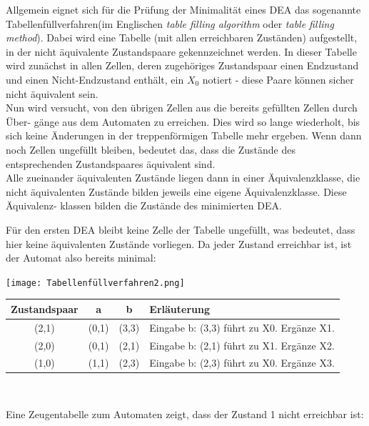 \begin{teile}
	
	\item
		Allgemein eignet sich für die Prüfung der Minimalität eines DEA das sogenannte \glqq Tabellenfüllverfahren\grqq (im Englischen \textit{table filling algorithm} oder \textit{table filling method}). Dabei wird eine Tabelle (mit allen erreichbaren Zuständen) aufgestellt, in der nicht äquivalente Zustandspaare gekennzeichnet werden. In dieser Tabelle wird zunächst in allen Zellen, deren zugehöriges Zustandspaar einen Endzustand und einen Nicht-Endzustand enthält, ein $X_0$ notiert - diese Paare können sicher nicht äquivalent sein.\\		
		Nun wird versucht, von den übrigen Zellen aus die bereits gefüllten Zellen durch Über- gänge aus dem Automaten zu erreichen. Dies wird so lange wiederholt, bis sich keine Änderungen in der treppenförmigen Tabelle mehr ergeben. Wenn dann noch Zellen ungefüllt bleiben, bedeutet das, dass die Zustände des entsprechenden Zustandspaares äquivalent sind.\\
		Alle zueinander äquivalenten Zustände liegen dann in einer Äquivalenzklasse, die nicht äquivalenten Zustände bilden jeweils eine eigene Äquivalenzklasse. Diese Äquivalenz- klassen bilden die Zustände des minimierten DEA.
		
		Für den ersten DEA bleibt keine Zelle der Tabelle ungefüllt, was bedeutet, dass hier keine äquivalenten Zustände vorliegen. Da jeder Zustand erreichbar ist, ist der Automat also bereits minimal:
	
	\texttt{[image: Tabellenfüllverfahren2.png]}
	
	\begin{tabular}{c|c|c|l}
		\textbf{Zustandspaar} & \textbf{a} & \textbf{b} & \textbf{Erläuterung} \\
		\hline
		(2,1)                 & (0,1)      & (3,3)      & Eingabe b: (3,3) führt zu X0. Ergänze X1. \\
		\hline
		(2,0)                 & (0,1)      & (2,1)      & Eingabe b: (2,1) führt zu X1. Ergänze X2. \\
		\hline
		(1,0)                 & (1,1)      & (2,3)      & Eingabe b: (2,3) führt zu X0. Ergänze X3. \\
	\end{tabular} \\

	\item
		Eine Zeugentabelle zum Automaten zeigt, dass der Zustand 1 nicht erreichbar ist:


\end{teile}
